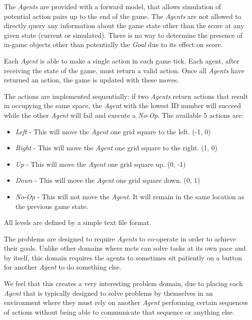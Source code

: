 \documentclass{IEEEtran}
\begin{document}
The \emph{Agents} are provided with a forward model, that allows simulation of potential action pairs up to the end of the game. The \emph{Agents} are not allowed to directly query any information about the game state other than the score at any given state (current or simulated). There is no way to determine the presence of in-game objects other than potentially the \emph{Goal} due to its effect on score.

Each \emph{Agent} is able to make a single action in each game tick. Each agent, after receiving the state of the game, must return a valid action. Once all \emph{Agents} have returned an action, the game is updated with these moves. 

The actions are implemented sequentially: if two \emph{Agents} return actions that result in occupying the same space, the \emph{Agent} with the lowest ID number will succeed while the other \emph{Agent} will fail and execute a \emph{No-Op}. The available 5 actions are:
\begin{itemize}
\item{\emph{Left} - This will move the \emph{Agent} one grid square to the left. (-1, 0)}
\item{\emph{Right} - This will move the \emph{Agent} one grid square to the right. (1, 0)}
\item{\emph{Up} - This will move the \emph{Agent} one grid square up. (0, -1)}
\item{\emph{Down} - This will move the \emph{Agent} one grid square down. (0, 1)}
\item{\emph{No-Op} - This will not move the \emph{Agent}. It will remain in the same location as the previous game state.}
\end{itemize}

All levels are defined by a simple text file format.

The problems are designed to require \emph{Agents} to co-operate in order to achieve their goals. Unlike other domains where \gls{mcts} can solve tasks at its own pace and by itself, this domain requires the agents to sometimes sit patiently on a button for another \emph{Agent} to do something else.

We feel that this creates a very interesting problem domain, due to placing each \emph{Agent} that is typically designed to solve problems by themselves in an environment where they must rely on another \emph{Agent} performing certain sequences of actions without being able to communicate that sequence or anything else.
\end{document}
